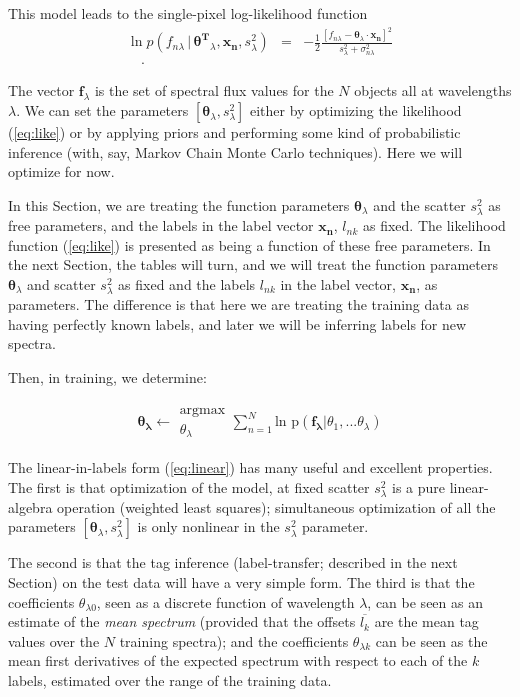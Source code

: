 \documentclass[12pt, preprint]{aastex}
\newcommand{\sectionname}{Section}
\newcommand{\set}[1]{\bm{#1}}
\newcommand{\mean}[1]{\overline{#1}}
\newcommand{\given}{\,|\,}
\begin{document}
This model leads to the single-pixel log-likelihood function 
\begin{eqnarray}
\ln p(f_{n\lambda}\given\set{\theta^T}_\lambda, \boldsymbol{x_n}, s_\lambda^2) &=&
 -\frac{1}{2}\frac{[f_{n\lambda} - \set{\theta}_\lambda \cdot \set{x_n}]^2}{s_\lambda^2 + \sigma_{n\lambda}^2}
\label{eq:like}\\
\quad.
\end{eqnarray}


The vector $\set{f}_\lambda$ is the set of spectral flux values for
the $N$ objects all at wavelengths $\lambda$.
We can set the parameters $[\set{\theta}_\lambda,s_\lambda^2]$ either by
optimizing the likelihood (\ref{eq:like}) or by applying priors and
performing some kind of probabilistic inference (with, say, Markov
Chain Monte Carlo techniques).
Here we will optimize for now.

In this \sectionname, we are treating the function parameters
$\set{\theta}_\lambda$ and the scatter $s_\lambda^2$ as free parameters, and the
labels in the label vector $\set{x_n}$, $l_{nk}$ as fixed.
The likelihood function (\ref{eq:like}) is presented as being a
function of these free parameters.
In the next \sectionname, the tables will turn, and we will treat the
function parameters $\set{\theta}_\lambda$ and scatter $s_{\lambda}^2$ as fixed and
the labels $l_{nk}$ in the label vector, $\set{x_n}$, as parameters.
The difference is that here we are treating the training data as
having perfectly known labels, and later we will be inferring labels for
new spectra.

Then, in training, we determine:

\begin{eqnarray}
\set{\theta_\lambda} \leftarrow \substack{\mbox{argmax}\\
{\theta_\lambda}  }
\sum_{n=1}^N \mbox{ln p}(\set{f_\lambda} | {\theta_1,...\theta_\lambda})
\end{eqnarray}

The linear-in-labels form (\ref{eq:linear}) has many useful and
excellent properties.
The first is that optimization of the model, at fixed scatter
$s_\lambda^2$ is a pure linear-algebra operation (weighted least
squares); simultaneous optimization of all the parameters
$[\set{\theta}_\lambda,s_\lambda^2]$ is only nonlinear in the $s_\lambda^2$
parameter.

%
The second is that the tag inference (label-transfer; described in the
next Section) on the test data will have a very simple form.
The third is that the coefficients $\theta_{\lambda 0}$, seen as a discrete
function of wavelength $\lambda$, can be seen as an estimate of
the \emph{mean spectrum} (provided that the offsets $\mean{l_k}$ are
the mean tag values over the $N$ training spectra); and the
coefficients $\theta_{\lambda k}$ can be seen as the mean first derivatives of
the expected spectrum with respect to each of the $k$ labels, estimated
over the range of the training data.
\end{document}
